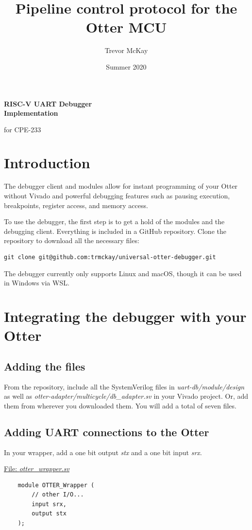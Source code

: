 \documentclass[10pt,a4paper]{article}
\title{Pipeline control protocol for the Otter MCU}
\author{Trevor McKay}
\date{Summer 2020}
\begin{document}
\begin{center}
    \Large\textbf{RISC-V UART Debugger\\Implementation}

    \medskip
    \small{for CPE-233}
\end{center}

\tableofcontents
\newpage

\section{Introduction}
The debugger client and modules allow for instant programming of your Otter without Vivado and
powerful debugging features such as pausing execution, breakpoints, register access,
and memory access.

To use the debugger, the first step is to get a hold of the modules and the debugging client.
Everything is included in a GitHub repository. Clone the repository to download all the necessary
files:

\begin{verbatim}
git clone git@github.com:trmckay/universal-otter-debugger.git
\end{verbatim}

The debugger currently only supports Linux and macOS, though it can be used in Windows via WSL.

\section{Integrating the debugger with your Otter}

\subsection{Adding the files}
From the repository, include all the SystemVerilog files in \emph{uart-db/module/design} as well as
\emph{otter-adapter/multicycle/db\_adapter.sv} in your Vivado project. Or, add them from wherever
you downloaded them. You will add a total of seven files.

\subsection{Adding UART connections to the Otter}

In your wrapper, add a one bit output \emph{stx} and a one bit input \emph{srx}.

\medskip
\noindent\underline{File: \emph{otter\_wrapper.sv}}
\begin{verbatim}
    module OTTER_Wrapper (
        // other I/O...
        input srx,
        output stx
    );
\end{verbatim}
\end{document}
